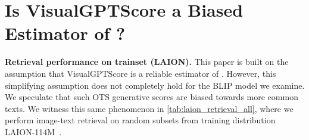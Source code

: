 \documentclass{article} \usepackage{iclr2024_conference,times}
\begin{document}
\section{Is VisualGPTScore a Biased Estimator of ?}
\label{app:biased}
{\bf Retrieval performance on trainset (LAION).} This paper is built on the assumption that VisualGPTScore is a reliable estimator of . However, this simplifying assumption does not completely hold for the BLIP model we examine. We speculate that such OTS generative scores are biased towards more common texts. We witness this same phenomenon in \autoref{tab:laion_retrieval_all}, where we perform image-text retrieval on random subsets from training distribution LAION-114M~\citep{blip}.

\begin{table}[h]
  \vspace{-2mm}
  \centering
\end{table}
\end{document}
